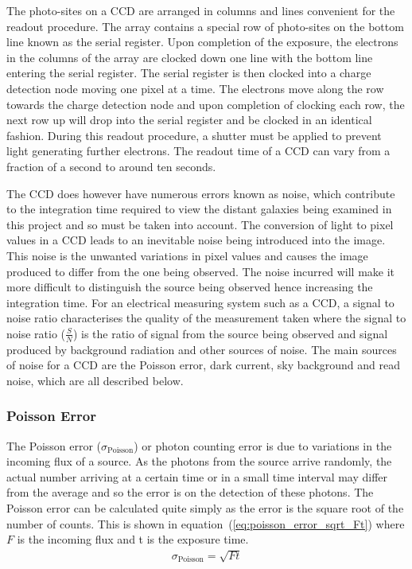 		The photo-sites on a CCD are arranged in columns and lines convenient for the readout procedure. The array contains a special row of photo-sites on the bottom line known as the serial register. Upon completion of the exposure, the electrons in the columns of the array are clocked down one line with the bottom line entering the serial register. The serial register is then clocked into a charge detection node moving one pixel at a time. The electrons move along the row towards the charge detection node and upon completion of clocking each row, the next row up will drop into the serial register and be clocked in an identical fashion\cite{Astronomical_Image_Processing}. During this readout procedure, a shutter must be applied to prevent light generating further electrons. The readout time of a CCD can vary from a fraction of a second to around ten seconds.

		The CCD does however have numerous errors known as noise, which contribute to the integration time required to view the distant galaxies being examined in this project and so must be taken into account. The conversion of light to pixel values in a CCD leads to an inevitable noise being introduced into the image. This noise is the unwanted variations in pixel values and causes the image produced to differ from the one being observed. The noise incurred will make it more difficult to distinguish the source being observed hence increasing the integration time. For an electrical measuring system such as a CCD, a signal to noise ratio characterises the quality of the measurement taken where the signal to noise ratio ($\frac{S}{N}$) is the ratio of signal from the source being observed and signal produced by background radiation and other sources of noise. The main sources of noise for a CCD are the Poisson error, dark current, sky background and read noise, which are all described below.


		\subsubsection{Poisson Error} %
		\label{ssub:poisson_error}
			The Poisson error ($\sigma_\text{Poisson}$) or photon counting error is due to variations in the incoming flux of a source. As the photons from the source arrive randomly, the actual number arriving at a certain time or in a small time interval may differ from the average and so the error is on the detection of these photons. The Poisson error can be calculated quite simply as the error is the square root of the number of counts. This is shown in equation~(\ref{eq:poisson_error_sqrt_Ft}) where $F$ is the incoming flux and t is the exposure time.
			\begin{align}
				\sigma_\text{Poisson} = \sqrt{Ft} \label{eq:poisson_error_sqrt_Ft}
			\end{align}

